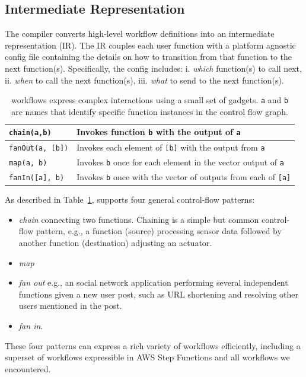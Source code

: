 \subsection{\name{} Intermediate Representation}\label{sec:ir}
The \name{} compiler converts high-level workflow definitions into an intermediate representation (IR). The IR couples each user function with a platform agnostic \name{} config file containing the details on how to transition from that function to the next function(s). Specifically, the \name{} config includes: i. \textit{which} function(s) to call next, ii. \textit{when} to call the next function(s), iii. \textit{what} to send to the next function(s). 

\begin{table}[t!]
	\centering
	\begin{tabular}{ |m{8em}| m{13em} | }
		\hline
		\texttt{chain(a,b) }& Invokes function \texttt{b} with the output of \texttt{a} \\
		\hline
		\texttt{fanOut(a, [b])} & Invokes each element of \texttt{[b]} with the output from \texttt{a} \\
		\hline
		\texttt{map(a, b)} & Invokes \texttt{b} once for each element in the vector output of \texttt{a} \\
		\hline
		\texttt{fanIn([a], b)} & Invokes \texttt{b} once with the vector of outputs from each of \texttt{[a]} \\
		\hline
	\end{tabular}
	\caption{\name{} workflows express complex interactions using a small set of
		gadgets. \texttt{a} and \texttt{b} are names that identify specific function
		instances in the control flow graph.}
	\label{tab:gadgets}
\end{table}


As described in Table~\ref{tab:gadgets}, \name{} supports four general  control-flow patterns:
\begin{itemize}
	\item \textit{chain} connecting two functions. Chaining is a simple but common control-flow pattern, e.g.,  a function (source) processing sensor data followed by another function (destination) adjusting an
	actuator. 
	\item \textit{map} 
	\item \textit{fan out}  e.g.,  an social network application performing
	several independent functions given a new user post, such as URL shortening
	and resolving other users mentioned in the post. 
	\item \textit{fan in}.  
\end{itemize}
 These four patterns  can express a rich variety of workflows
efficiently, including a superset of workflows expressible in AWS Step
Functions and all workflows we encountered.  

